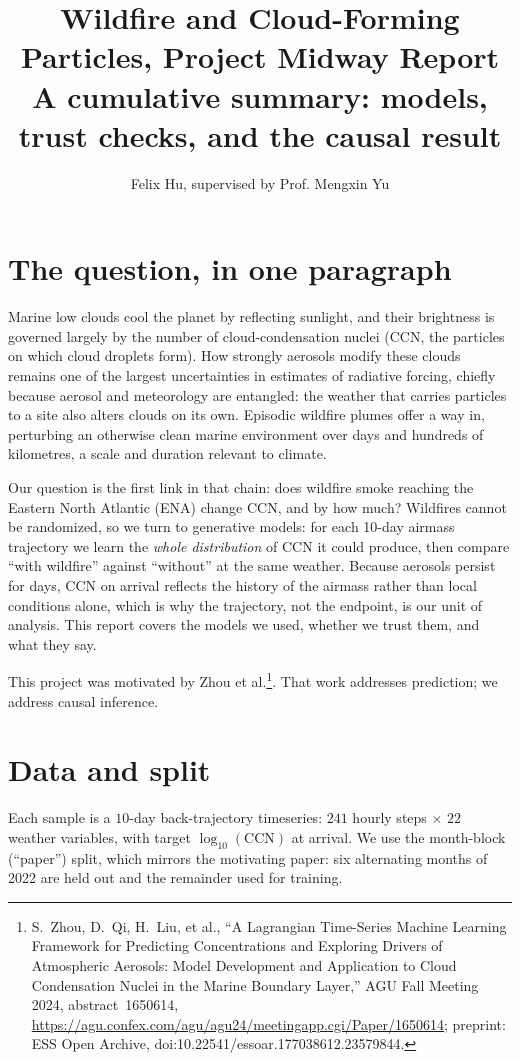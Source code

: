 \documentclass[11pt]{article}
\title{\vspace{-1.5cm}Wildfire and Cloud-Forming Particles, Project Midway Report\\
{\large A cumulative summary: models, trust checks, and the causal result}}
\author{Felix Hu, supervised by Prof. Mengxin Yu}
\date{}
\begin{document}
\maketitle
\vspace{-1.1cm}

\section*{The question, in one paragraph}
Marine low clouds cool the planet by reflecting sunlight, and their brightness is governed
largely by the number of cloud-condensation nuclei (CCN, the particles on which cloud
droplets form). How strongly aerosols modify these clouds remains one of the largest
uncertainties in estimates of radiative forcing, chiefly because aerosol and meteorology
are entangled: the weather that carries particles to a site also alters clouds on its own.
Episodic wildfire plumes offer a way in, perturbing an otherwise clean marine environment
over days and hundreds of kilometres, a scale and duration relevant to climate.

Our question is the first link in that chain: does wildfire smoke reaching the Eastern
North Atlantic (ENA) change CCN, and by how much? Wildfires cannot be randomized, so we
turn to generative models: for each 10-day airmass trajectory we learn the \emph{whole
distribution} of CCN it could produce, then compare ``with wildfire'' against ``without''
at the same weather. Because aerosols persist for days, CCN on arrival reflects the history
of the airmass rather than local conditions alone, which is why the trajectory, not the
endpoint, is our unit of analysis. This report covers the models we used, whether we trust
them, and what they say.

This project was motivated by Zhou et al.\footnote{S.~Zhou, D.~Qi, H.~Liu, et al., ``A Lagrangian Time-Series Machine Learning Framework for Predicting Concentrations and Exploring Drivers of Atmospheric Aerosols: Model Development and Application to Cloud Condensation Nuclei in the Marine Boundary Layer,'' AGU Fall Meeting 2024, abstract~1650614, \url{https://agu.confex.com/agu/agu24/meetingapp.cgi/Paper/1650614}; preprint: ESS Open Archive, doi:10.22541/essoar.177038612.23579844.}. That work addresses
prediction; we address causal inference.

\section*{Data and split}
Each sample is a $10$-day back-trajectory timeseries: $241$ hourly steps $\times$ $22$ weather
variables, with target $\log_{10}(\mathrm{CCN})$ at arrival. We use the month-block
(``paper'') split, which mirrors the motivating paper: six alternating months of 2022 are
held out and the remainder used for training.
\end{document}
